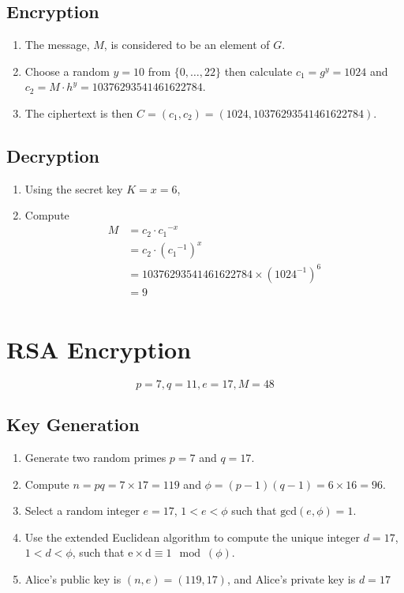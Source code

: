 \documentclass[11pt]{article} %
\begin{document}
\subsection{Encryption}
\begin{enumerate}
	\item The message, $M$, is considered to be an element of $G$.
	\item Choose a random $y=10$ from $\{0,\ldots, 22\}$ then calculate $c_1 =
		g^y = 1024$ and $c_2 = M \cdot h^y = 10376293541461622784$.
	\item The ciphertext is then $C = (c_1, c_2) = (1024, 10376293541461622784)$.
\end{enumerate}

\subsection{Decryption}
\begin{enumerate}
	\item Using the secret key $K=x=6$,
	\item Compute
		\begin{align*}
			M &= c_2 \cdot c{_1}^{-x} \\
			  &= c_2 \cdot {(c{_1}^{-1})}^x \\
			  &= 10376293541461622784 \times {(1024^{-1})}^6 \\
			  &= 9 \\
		\end{align*}
\end{enumerate}

\section{RSA Encryption}
\begin{equation}
	p=7, q=11, e=17, M=48
\end{equation}
\subsection{Key Generation}
\begin{enumerate}
	\item Generate two random primes $p=7$ and $q=17$.
	\item Compute $n=pq = 7 \times 17 = 119$ and $\phi = (p-1)(q-1) = 6 \times
		16 = 96$.
	\item Select a random integer $e=17$, $1<e<\phi$ such that
		$\text{gcd}(e,\phi) = 1$.
	\item Use the extended Euclidean algorithm to compute the unique integer
		$d=17$, $1<d<\phi$, such that $\text{e}\times\text{d} \equiv 1 \mod
		(\phi)$.
	\item Alice's public key is $(n,e) = (119, 17)$, and Alice's private key is $d=17$
\end{enumerate}
\end{document}
